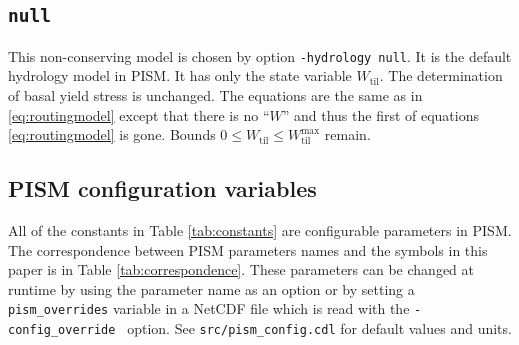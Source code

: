 \documentclass[gmd]{copernicus}   %
\newcommand{\text}{\textrm}
\newcommand{\Wtil}{W_{\text{til}}}
\newcommand{\Wtilmax}{W_{\text{til}}^{\text{max}}}
\begin{document}
\subsection{\texttt{null}}  This non-conserving model is chosen by option \texttt{-hydrology null}.   It is the default hydrology model in PISM.  It has only the state variable $\Wtil$.  The determination of basal yield stress is unchanged.  The equations are the same as in \eqref{eq:routingmodel} except that there is no ``$W$'' and thus the first of equations \eqref{eq:routingmodel} is gone.  Bounds $0\le \Wtil \le \Wtilmax$ remain.

\subsection{PISM configuration variables}  All of the constants in Table \ref{tab:constants} are configurable parameters in PISM.  The correspondence between PISM parameters names and the symbols in this paper is in Table \ref{tab:correspondence}.  These parameters can be changed at runtime by using the parameter name as an option or by setting a \verb|pism_overrides| variable in a NetCDF file which is read with the \verb|-config_override | option.  See \verb|src/pism_config.cdl| for default values and units.
\end{document}
